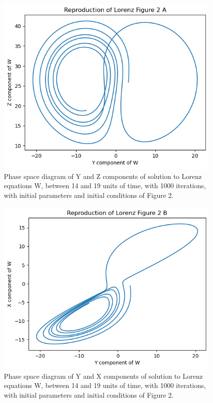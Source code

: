 \documentclass{article}
\begin{document}
\begin{multicols}{2}
\begin{figure} [H]
    \centering
    \includegraphics[width=1.0\linewidth]{Assignment 3 Images/download (3).png}
    \caption{Phase space diagram of Y and Z components of solution to Lorenz equations W, between 14 and 19 units of time, with 1000 iterations, with initial parameters and initial conditions of Figure 2.}
    \label{fig:enter-label}
\end{figure}

\begin{figure} [H]
    \centering
    \includegraphics[width=1.0\linewidth]{Assignment 3 Images/download (4).png}
    \caption{Phase space diagram of Y and X components of solution to Lorenz equations W, between 14 and 19 units of time, with 1000 iterations, with initial parameters and initial conditions of Figure 2.}
    \label{fig:enter-label}
\end{figure}


\end{multicols}
\end{document}
